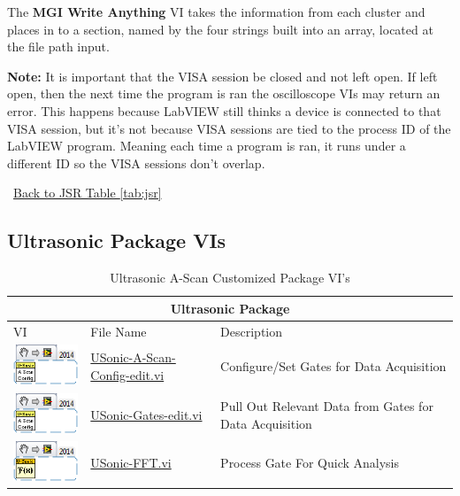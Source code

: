 \documentclass[11pt,a4paper,oldfontcommands]{memoir}
\begin{document}
The \textbf{MGI Write Anything} VI takes the information from each cluster and places in to a section, named by the four strings built into an array, located at the file path input.

\textbf{Note:} It is important that the VISA session be closed and not left open. If left open, then the next time the program is ran the oscilloscope VIs may return an error. This happens because LabVIEW still thinks a device is connected to that VISA session, but it's not because VISA sessions are tied to the process ID of the LabVIEW program. Meaning each time a program is ran, it runs under a different ID so the VISA sessions don't overlap.

\noindent\hrulefill\, \hyperref[tab:jsr]{Back to JSR Table \ref{tab:jsr}}

\newpage

\subsection{Ultrasonic Package VIs}

\begin{table}[H]
	\centering
	\begin{tabular}{ m{2.5cm} | m{5cm} | m{5cm} }
		\hline
		\hline \multicolumn{3}{c}{Ultrasonic Package} \\ \hline \hline
		VI & File Name & Description \\ \hline
		\includegraphics[scale=0.625]{USonic-A-Scan-Config-edit_main_01} & \hyperref[USonic-Config]{USonic-A-Scan-Config-edit.vi} & Configure/Set Gates for Data Acquisition \\ \hline
		\includegraphics[scale=0.625]{USonic-A-Scan-Config-edit_main_01} & \hyperref[USonic-Gates]{USonic-Gates-edit.vi} & Pull Out Relevant Data from Gates for Data Acquisition \\ \hline
		\includegraphics[scale=0.625]{USonic-FFT_main_01} & \hyperref[USonic-FFT]{USonic-FFT.vi} & Process Gate For Quick Analysis \\ \hline
	\end{tabular}
	\caption{Ultrasonic A-Scan Customized Package VI's}
	\label{tab:usonic}
\end{table}
\end{document}
